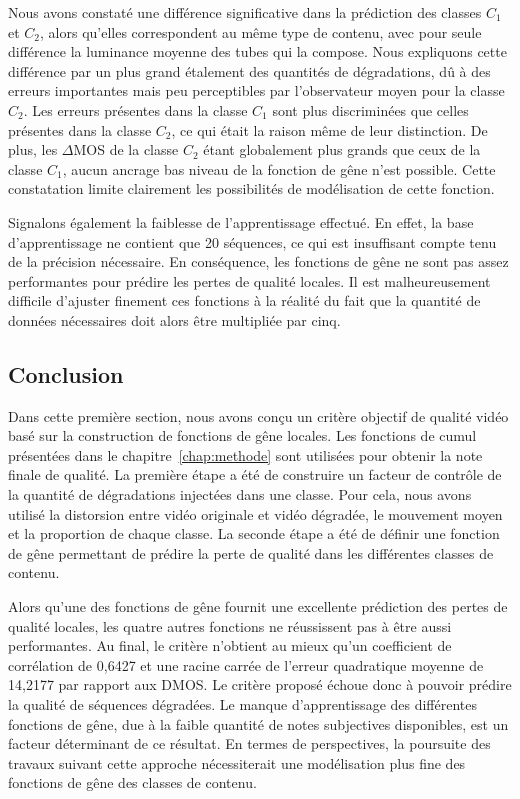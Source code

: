 Nous avons constaté une différence significative dans la prédiction des classes $C_1$ et $C_2$, alors qu'elles correspondent au même type de contenu, avec pour seule différence la luminance moyenne des tubes qui la compose. Nous expliquons cette différence par un plus grand étalement des quantités de dégradations, dû à des erreurs importantes mais peu perceptibles par l'observateur moyen pour la classe $C_2$. Les erreurs présentes dans la classe $C_1$ sont plus discriminées que celles présentes dans la classe $C_2$, ce qui était la raison même de leur distinction. De plus, les $\Delta$MOS de la classe $C_2$ étant globalement plus grands que ceux de la classe $C_1$, aucun ancrage bas niveau de la fonction de gêne n'est possible. Cette constatation limite clairement les possibilités de modélisation de cette fonction.

Signalons également la faiblesse de l'apprentissage effectué. En effet, la base d'apprentissage ne contient que 20 séquences, ce qui est insuffisant compte tenu de la précision nécessaire. En conséquence, les fonctions de gêne ne sont pas assez performantes pour prédire les pertes de qualité locales. Il est malheureusement difficile d'ajuster finement ces fonctions à la réalité du fait que la quantité de données nécessaires doit alors être multipliée par cinq.


\subsection{Conclusion}
Dans cette première section, nous avons conçu un critère objectif de qualité vidéo basé sur la construction de fonctions de gêne locales. Les fonctions de cumul présentées dans le chapitre~\ref{chap:methode} sont utilisées pour obtenir la note finale de qualité. La première étape a été de construire un facteur de contrôle de la quantité de dégradations injectées dans une classe. Pour cela, nous avons utilisé la distorsion entre vidéo originale et vidéo dégradée, le mouvement moyen et la proportion de chaque classe. La seconde étape a été de définir une fonction de gêne permettant de prédire la perte de qualité dans les différentes classes de contenu.

Alors qu'une des fonctions de gêne fournit une excellente prédiction des pertes de qualité locales, les quatre autres fonctions ne réussissent pas à être aussi performantes. Au final, le critère n'obtient au mieux qu'un coefficient de corrélation de 0,6427 et une racine carrée de l'erreur quadratique moyenne de 14,2177 par rapport aux DMOS. Le critère proposé échoue donc à pouvoir prédire la qualité de séquences dégradées. Le manque d'apprentissage des différentes fonctions de gêne, due à la faible quantité de notes subjectives disponibles, est un facteur déterminant de ce résultat. En termes de perspectives, la poursuite des travaux suivant cette approche nécessiterait une modélisation plus fine des fonctions de gêne des classes de contenu.


